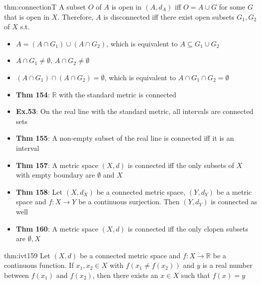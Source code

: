 \documentclass[landscape, 8pt]{extarticle}
\begin{document}
\begin{multicols}{3}
\begin{thm}{thm:connection}{T}
    \vspace{-5pt}
    A subset $O$ of $A$ is open in $(A, d_{A})$ iff $O = A \cup G$ for some $G$ that is open in $X$. Therefore, $A$ is disconnected iff there exist open subsets $G_{1}, G_{2}$ of $X$ s.t.
    \vspace{-5pt}
    \begin{itemize}[leftmargin=*]
        \item $A = (A \cap G_{1}) \cup (A \cap G_{2})$, which is equivalent to $A \subseteq G_{1} \cup G_{2}$
        \item $A \cap G_{1} \ne \emptyset,\, A \cap G_{2}\ne \emptyset$
        \item $(A \cap G_{1}) \cap (A \cap G_{2}) = \emptyset$, which is equivalent to $A \cap G_{1} \cap G_{2} = \emptyset$
    \end{itemize}

    \vspace{-5pt}
    \vspace{-8pt}

    \begin{itemize}[leftmargin=*]
        \item \textbf{Thm 154}: $\mathbb{R}$ with the standard metric is connected
        \item \textbf{Ex.53}: On the real line with the standard metric, all intervals are connected sets
        \item \textbf{Thm 155}: A non-empty subset of the real line is connected iff it is an interval
        \item \textbf{Thm 157}: A metric space $(X, d)$ is connected iff the only subsets of $X$ with empty boundary are $\emptyset$ and $X$
        \item \textbf{Thm 158}: Let $(X, d_{X})$ be a connected metric space, $(Y, d_{Y})$ be a metric space and $f : X \to Y$ be a continuous surjection. Then $(Y, d_{Y})$ is connected as well
        \item \textbf{Thm 160}: A metric space $(X, d)$ is connected iff the only clopen subsets are $\emptyset, X$
    \end{itemize}
\end{thm}

\begin{thm}{thm:ivt}{159}
    Let $(X, d)$ be a connected metric space and $f : X \to \mathbb{R}$ be a continuous function. If $x_{1}, x_{2}\in X$ with $f(x_{1} \ne f(x_{2}))$ and $y$ is a real number between $f(x_{1})$ and $f(x_{2})$, then there exists an $x\in X$ such that $f(x) = y$
\end{thm}


\end{multicols}
\end{document}
